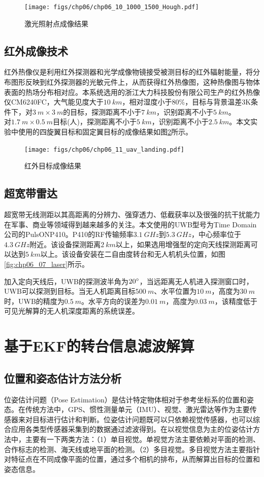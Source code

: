 \begin{figure}[!t]
	\centering
	\texttt{[image: figs/chp06/chp06\_10\_1000\_1500\_Hough.pdf]}	
	\caption{激光照射点成像结果}
	\label{fig:chp06_10_1000_1500_Hough}
\end{figure}


\subsection{红外成像技术}
红外热像仪是利用红外探测器和光学成像物镜接受被测目标的红外辐射能量，将分布图形反映到红外探测器的光敏元件上，从而获得红外热像图，这种热像图与物体表面的热场分布相对应。本系统选用的浙江大力科技股份有限公司生产的红外热像仪CM6240FC，大气能见度大于$10\ km$，相对湿度小于$80\%$，目标与背景温差3K条件下，对$3\ m\times3\ m$的目标，探测距离不小于$7\ km$，识别距离不小于$5\ km$。$对1.7\ m\times0.5\ m$目标(人)，探测距离不小于$5\ km$，识别距离不小于$2.5\ km$。本文实验中使用的四旋翼目标和固定翼目标的成像结果如图\ref{fig:chp06_11_uav_landing}所示。

\begin{figure}[!t]
	\centering
	\texttt{[image: figs/chp06/chp06\_11\_uav\_landing.pdf]}	
	\caption{红外目标成像结果}
	\label{fig:chp06_11_uav_landing}
\end{figure}

\subsection{超宽带雷达}
超宽带无线测距以其高距离的分辨力、强穿透力、低截获率以及很强的抗干扰能力在军事、商业等领域得到越来越多的关注。本文使用的UWB型号为Time Domain公司的PulsONP410。P410的RF传输频率$3.1\ GHz$到$5.3\ GHz$，中心频率位于$4.3\ GHz$附近。该设备探测距离$2\ km$以上，如果选用增强型的定向天线探测距离可以达到$5\ km$以上。该设备安装在二自由度转台和无人机机头位置，如图\ref{fig:chp06_07_laser}所示。

加入定向天线后，UWB的探测波半角为$20\degree$，当远距离无人机进入探测窗口时，UWB可以探测到目标。当无人机距离目标$500\ m$、水平位置为$10\ m$，高度为$30\ m$时，UWB的精度为$0.5\ m$。水平方向的误差为$0.01\ m$，高度为$0.03\ m$，该精度低于可见光解算的无人机深度距离的系统误差。

\section{基于EKF的转台信息滤波解算}
\subsection{位置和姿态估计方法分析}
位姿估计问题（Pose Estimation）是估计特定物体相对于参考坐标系的位置和姿态。在传统方法中，GPS、惯性测量单元（IMU）、视觉、激光雷达等作为主要传感器来对目标进行估计和判断。位姿估计问题既可以只依赖视觉传感器，也可以综合应用各类型传感器采集到的数据通过滤波得到。在以视觉信息为主的位姿估计方法中，主要有一下两类方法：（1）单目视觉。单视觉方法主要依赖对平面的检测、合作标志的检测、海天线或地平面的检测。（2）多目视觉。多目视觉方法主要指针对特征点在不同成像平面的位置，通过多个相机的排布，从而解算出目标的位置和姿态信息。

